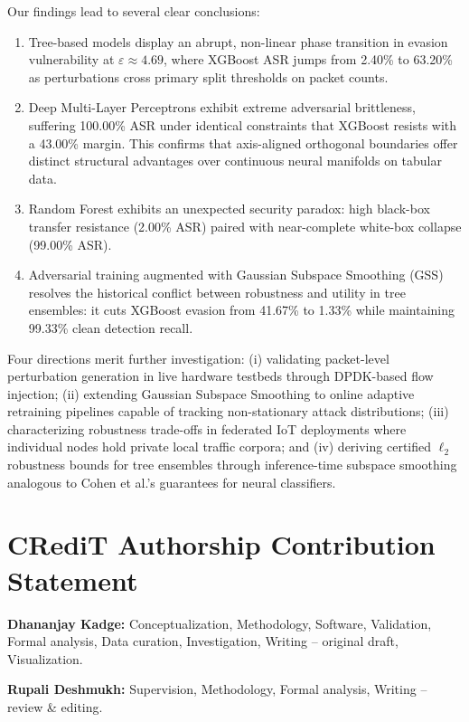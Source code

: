 \documentclass[final,5p,times,twocolumn]{elsarticle}
\begin{document}
Our findings lead to several clear conclusions:
\begin{enumerate}
    \item Tree-based models display an abrupt, non-linear phase transition in evasion vulnerability at $\varepsilon \approx 4.69$, where XGBoost ASR jumps from 2.40\% to 63.20\% as perturbations cross primary split thresholds on packet counts.
    \item Deep Multi-Layer Perceptrons exhibit extreme adversarial brittleness, suffering 100.00\% ASR under identical constraints that XGBoost resists with a 43.00\% margin. This confirms that axis-aligned orthogonal boundaries offer distinct structural advantages over continuous neural manifolds on tabular data.
    \item Random Forest exhibits an unexpected security paradox: high black-box transfer resistance (2.00\% ASR) paired with near-complete white-box collapse (99.00\% ASR).
    \item Adversarial training augmented with Gaussian Subspace Smoothing (GSS) resolves the historical conflict between robustness and utility in tree ensembles: it cuts XGBoost evasion from 41.67\% to 1.33\% while maintaining 99.33\% clean detection recall.
\end{enumerate}

Four directions merit further investigation: (i) validating packet-level perturbation generation in live hardware testbeds through DPDK-based flow injection; (ii) extending Gaussian Subspace Smoothing to online adaptive retraining pipelines capable of tracking non-stationary attack distributions; (iii) characterizing robustness trade-offs in federated IoT deployments where individual nodes hold private local traffic corpora; and (iv) deriving certified $\ell_2$ robustness bounds for tree ensembles through inference-time subspace smoothing analogous to Cohen et al.'s guarantees for neural classifiers.

\section*{CRediT Authorship Contribution Statement}
\noindent\textbf{Dhananjay Kadge:} Conceptualization, Methodology, Software, Validation, Formal analysis, Data curation, Investigation, Writing -- original draft, Visualization.

\vspace{0.35em}
\noindent\textbf{Rupali Deshmukh:} Supervision, Methodology, Formal analysis, Writing -- review \& editing.
\end{document}
